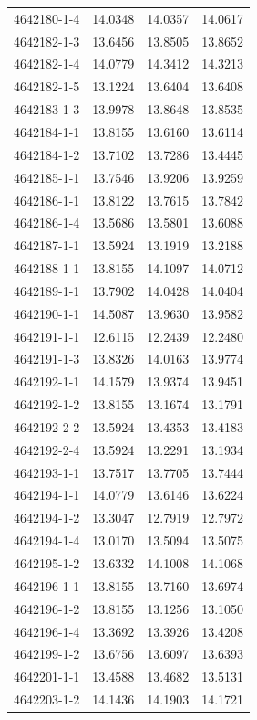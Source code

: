 \begin{longtable}{lrrr}
4642180-1-4 & 14.0348 & 14.0357 & 14.0617 \\
4642182-1-3 & 13.6456 & 13.8505 & 13.8652 \\
4642182-1-4 & 14.0779 & 14.3412 & 14.3213 \\
4642182-1-5 & 13.1224 & 13.6404 & 13.6408 \\
4642183-1-3 & 13.9978 & 13.8648 & 13.8535 \\
4642184-1-1 & 13.8155 & 13.6160 & 13.6114 \\
4642184-1-2 & 13.7102 & 13.7286 & 13.4445 \\
4642185-1-1 & 13.7546 & 13.9206 & 13.9259 \\
4642186-1-1 & 13.8122 & 13.7615 & 13.7842 \\
4642186-1-4 & 13.5686 & 13.5801 & 13.6088 \\
4642187-1-1 & 13.5924 & 13.1919 & 13.2188 \\
4642188-1-1 & 13.8155 & 14.1097 & 14.0712 \\
4642189-1-1 & 13.7902 & 14.0428 & 14.0404 \\
4642190-1-1 & 14.5087 & 13.9630 & 13.9582 \\
4642191-1-1 & 12.6115 & 12.2439 & 12.2480 \\
4642191-1-3 & 13.8326 & 14.0163 & 13.9774 \\
4642192-1-1 & 14.1579 & 13.9374 & 13.9451 \\
4642192-1-2 & 13.8155 & 13.1674 & 13.1791 \\
4642192-2-2 & 13.5924 & 13.4353 & 13.4183 \\
4642192-2-4 & 13.5924 & 13.2291 & 13.1934 \\
4642193-1-1 & 13.7517 & 13.7705 & 13.7444 \\
4642194-1-1 & 14.0779 & 13.6146 & 13.6224 \\
4642194-1-2 & 13.3047 & 12.7919 & 12.7972 \\
4642194-1-4 & 13.0170 & 13.5094 & 13.5075 \\
4642195-1-2 & 13.6332 & 14.1008 & 14.1068 \\
4642196-1-1 & 13.8155 & 13.7160 & 13.6974 \\
4642196-1-2 & 13.8155 & 13.1256 & 13.1050 \\
4642196-1-4 & 13.3692 & 13.3926 & 13.4208 \\
4642199-1-2 & 13.6756 & 13.6097 & 13.6393 \\
4642201-1-1 & 13.4588 & 13.4682 & 13.5131 \\
4642203-1-2 & 14.1436 & 14.1903 & 14.1721 \\

\end{longtable}
